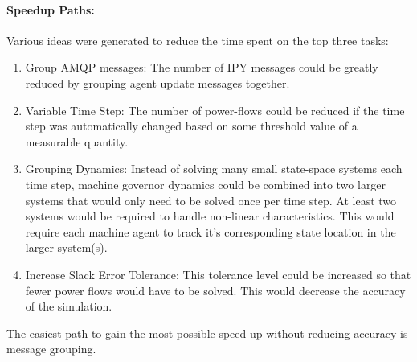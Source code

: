 \documentclass[12pt]{article}
\begin{document}
\begin{multicols}{2}
\paragraph{Speedup Paths:} Various ideas were generated to reduce the time spent on the top three tasks:
\begin{enumerate}
\item Group AMQP messages: The number of IPY messages could be greatly reduced by grouping agent update messages together.
\item Variable Time Step: The number of power-flows could be reduced if the time step was automatically changed based on some threshold value of a measurable quantity.
\item Grouping Dynamics: Instead of solving many small state-space systems each time step, machine governor dynamics could be combined into two larger systems that would only need to be solved once per time step. At least two systems would be required to handle non-linear characteristics. This would require each machine agent to track it's corresponding state location in the larger system(s).
\item Increase Slack Error Tolerance: This tolerance level could be increased so that fewer power flows would have to be solved. This would decrease the accuracy of the simulation.
\end{enumerate}
The easiest path to gain the most possible speed up without reducing accuracy is message grouping.

\end{multicols}

\pagebreak
\end{document}
